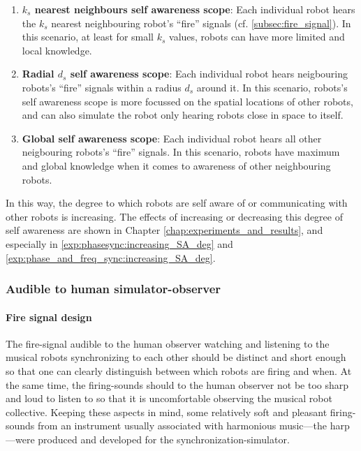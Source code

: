 		\begin{enumerate}
			\item \textbf{$k_s$ nearest neighbours self awareness scope}: Each individual robot hears the $k_s$ nearest neighbouring robot's ``fire'' signals (cf. \ref{subsec:fire_signal}). In this scenario, at least for small $k_s$ values, robots can have more limited and local knowledge.
			\item \textbf{Radial $d_s$ self awareness scope}: Each individual robot hears neigbouring robots's ``fire'' signals within a radius $d_s$ around it. In this scenario, robots's self awareness scope is more focussed on the spatial locations of other robots, and can also simulate the robot only hearing robots close in space to itself.
			\item \textbf{Global self awareness scope}: Each individual robot hears all other neigbouring robots's ``fire'' signals. In this scenario, robots have maximum and global knowledge when it comes to awareness of other neighbouring robots.
		\end{enumerate}
		
		In this way, the degree to which robots are self aware of or communicating with other robots is increasing. The effects of increasing or decreasing this degree of self awareness are shown in Chapter \ref{chap:experiments_and_results}, and especially in \ref{exp:phasesync:increasing_SA_deg} and \ref{exp:phase_and_freq_sync:increasing_SA_deg}.
		

		\subsubsection{Audible to human simulator-observer}
		\label{human_audible_fire_signals}

			\paragraph{Fire signal design}
			The fire-signal audible to the human observer watching and listening to the musical robots synchronizing to each other should be distinct and short enough so that one can clearly distinguish between which robots are firing and when. At the same time, the firing-sounds should to the human observer not be too sharp and loud to listen to so that it is uncomfortable observing the musical robot collective. Keeping these aspects in mind, some relatively soft and pleasant firing-sounds from an instrument usually associated with harmonious music—the harp—were produced and developed for the synchronization-simulator.
			
